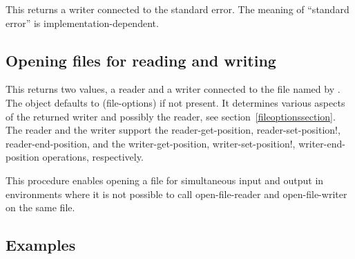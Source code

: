 \begin{entry}{%
}
   
This returns a writer connected to the standard error. The meaning of
``standard error'' is implementation-dependent.
\end{entry}   

\subsection{Opening files for reading and writing}

\begin{entry}{%
}
   
This returns two values, a reader and a writer connected to the file
named by . The  object defaults to
{\cf (file-options)} if not present. It determines various aspects of
the returned writer and possibly the reader, see
section~\ref{fileoptionssection}. The reader and the writer support
the {\cf reader-get-position}, {\cf reader-set-position!}, {\cf
  reader-end-position}, and the {\cf writer-get-position}, {\cf
  writer-set-position!}, {\cf writer-end-position} operations,
respectively.

\begin{note}
  This procedure enables opening a file for simultaneous input and
  output in environments where it is not possible to call
  open-file-reader and open-file-writer on the same file.
\end{note}     
\end{entry}

\subsection{Examples}


